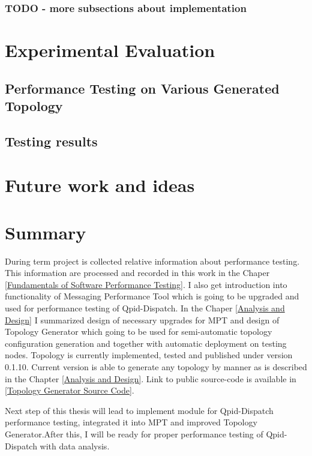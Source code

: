 \subsection{TODO - more subsections about implementation}

\chapter{Experimental Evaluation}
\label{Experimental Evaluation}

\section{Performance Testing on Various Generated Topology}

\section{Testing results}

\chapter{Future work and ideas}
\label{Future work and ideas}

\chapter{Summary}
\label{Summary}
During term project is collected relative information about performance testing. This information are processed and recorded in this work in the Chaper \ref{Fundamentals of Software Performance Testing}. I also get introduction into functionality of Messaging Performance Tool which is going to be upgraded and used for performance testing of Qpid-Dispatch. In the Chaper \ref{Analysis and Design} I summarized design of necessary upgrades for MPT and design of Topology Generator which going to be used for semi-automatic topology configuration generation and together with automatic deployment on testing nodes. Topology is currently implemented, tested and published under version 0.1.10. Current version is able to generate any topology by manner as is described in the Chapter \ref{Analysis and Design}. Link to public source-code is available in \ref{Topology Generator Source Code}.

Next step of this thesis will lead to implement module for Qpid-Dispatch performance testing, integrated it into MPT and improved Topology Generator.After this, I will be ready for proper performance testing of Qpid-Dispatch with data analysis.

